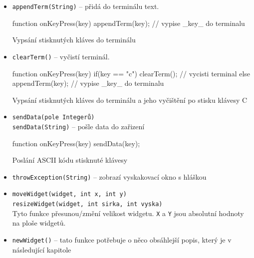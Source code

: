 \documentclass[12pt, a4paper, oneside]{article}
\begin{document}
\begin{itemize}
    \item {\color{blue}\verb/appendTerm(String)/} -- přidá do terminálu text.\\
        \begin{listing}[H]
        \begin{jscode}
function onKeyPress(key) {
    appendTerm(key); // vypise _key_ do terminalu
}
        \end{jscode}
        \caption{Vypsání stisknutých kláves do terminálu}
        \end{listing}

    \item {\color{blue}\verb/clearTerm()/} -- vyčistí terminál.\\
        \begin{listing}[H]
        \begin{jscode}
function onKeyPress(key) {
    if(key == "c")
        clearTerm(); // vycisti terminal
    else
        appendTerm(key); // vypise _key_ do terminalu
}
        \end{jscode}
        \caption{Vypsání stisknutých kláves do terminálu a jeho vyčištění po stisku klávesy C}
        \end{listing}

    \item {\color{blue}\verb/sendData(pole Integerů)/} \\
         {\color{blue}\verb/sendData(String)/} -- pošle data do zařizení\\
        \begin{listing}[H]
        \begin{jscode}
function onKeyPress(key) {
    sendData(key);
}
        \end{jscode}
        \caption{Poslání ASCII kódu stisknuté klávesy}
        \end{listing}

    \item {\color{blue}\verb/throwException(String)/} -- zobrazí vyskakovací okno s hláškou

    \item {\color{blue}\verb/moveWidget(widget, int x, int y)/} \\
    {\color{blue}\verb/resizeWidget(widget, int sirka, int vyska)/} \\
        Tyto funkce přesunou/změní velikost widgetu. \verb|X| a \verb|Y| jsou absolutní hodnoty na ploše widgetů.

    \item {\color{blue}\verb/newWidget()/} -- tato funkce potřebuje o něco obsáhlejší popis, který je v následující kapitole
\end{itemize}
\end{document}
